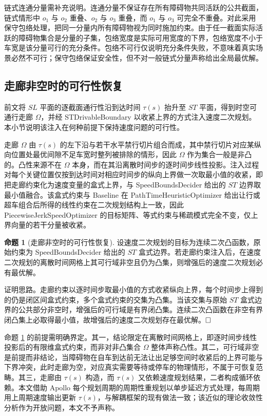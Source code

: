 \documentclass[a4paper,11pt]{ctexart}
\theoremstyle{definition}
\newtheorem{proposition}{命题}[section]
\begin{document}
链式连通分量需补充说明。连通分量不保证存在所有障碍物共同活跃的公共截面，链式情形中 $o_1$ 与 $o_2$ 重叠、$o_2$ 与 $o_3$ 重叠，而 $o_1$ 与 $o_3$ 可完全不重叠。对此采用保守包络处理，把同一分量内所有障碍物视为同时施加约束。由于任一截面实际活跃的障碍物集合是分量的子集，包络宽度是实际可用宽度的下界，包络宽度不小于车宽是该分量可行的充分条件。包络不可行仅说明充分条件失败，不意味着真实场景必然不可行；保守包络保证安全性，但不对一般链式分量声称给出全局最优解。

\subsection{走廊非空时的可行性恢复}
\label{sec:thy_feasibility}

前文将 $SL$ 平面的逐截面通行性沿到达时间 $\tau(s)$ 抬升至 $ST$ 平面，得到时空可通行走廊 $\Omega$，并经 STDrivableBoundary 以收紧上界的方式注入速度二次规划。本小节说明该注入在何种前提下保持速度问题的可行性。

走廊 $\Omega$ 由 $\tau(s)$ 的左下沿与若干水平禁行切片组合而成，其中禁行切片对应某纵向位置处最优间隙不足车宽时整列被排除的情形，因此 $\Omega$ 作为集合一般是非凸的。凸性来源不在 $\Omega$ 本身，而在其沿离散时间步的逐时间步线性投影。注入过程对每个关键位置仅按到达时间对相应时间步的纵向上界做一次取最小值的收紧，即把走廊约束化为速度变量的盒式上界，与 SpeedBoundsDecider 给出的 $ST$ 边界取最小值融合。该盒式约束与 Baseline 在 PathTimeHeuristicOptimizer 给出让行或超车组合后所得的线性约束在二次规划结构上一致，因此 PiecewiseJerkSpeedOptimizer 的目标矩阵、等式约束与稀疏模式完全不变，仅上界向量的若干分量被收紧。

\begin{proposition}[走廊非空时的可行性恢复]
\label{prop:feasibility_recovery}
设速度二次规划的目标为连续二次凸函数，原始约束为 SpeedBoundsDecider 给出的 $ST$ 盒式边界。若走廊约束注入后，在速度二次规划的离散时间网格上其可行域非空且仍为凸集，则增强后的速度二次规划必有最优解。
\end{proposition}

证明思路。走廊约束以逐时间步取最小值的方式收紧纵向上界，每个时间步上得到的仍是闭区间盒式约束，多个盒式约束的交集为凸集。当该交集与原始 $ST$ 盒式边界的公共部分非空时，增强后的可行域是有界闭凸集。连续二次凸函数在非空有界闭凸集上必取得最小值，故增强后的速度二次规划存在最优解。$\hfill\Box$

命题 \ref{prop:feasibility_recovery} 的前提需明确界定。其一，结论限定在离散时间网格上，即逐时间步线性投影后的有限维盒式约束，而非对非凸集合 $\Omega$ 整体声称凸性。其二，可行域非空是前提而非结论，当障碍物在自车到达前无法让出足够空间时收紧后的上界可能与下界冲突，此时走廊为空，对应真实需要等待或停车的物理情形，不属于可恢复范畴。其三，走廊由 $\tau(s)$ 构造，而 $\tau(s)$ 又依赖速度规划结果，二者构成循环依赖。本文借助 Apollo 每个规划周期的周期性重规划以单步延迟方式处理，每周期用上周期速度输出更新 $\tau(s)$，与解耦框架的现有做法一致；该近似的理论收敛性分析作为开放问题，本文不予声称。
\end{document}

